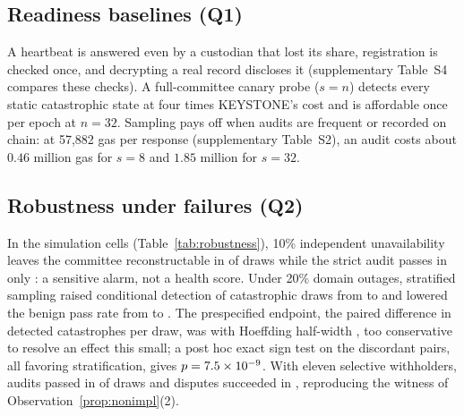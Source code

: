 \documentclass[Crown,sagev]{sagej}
\theoremstyle{plain}
\theoremstyle{definition}
\theoremstyle{remark}
\begin{document}
\begin{table}[t]
\caption{Experimental configuration. The baseline committee is $n=32$, $t=22$, $s=q=8$ with four failure domains of eight custodians.}
\label{tab:config}
\centering
\footnotesize

\end{table}

\subsection{Readiness baselines (Q1)}

A heartbeat is answered even by a custodian that lost its share, registration is checked once, and decrypting a real record discloses it (supplementary Table~S4 compares these checks). A full-committee canary probe ($s=n$) detects every static catastrophic state at four times KEYSTONE's cost and is affordable once per epoch at $n=32$. Sampling pays off when audits are frequent or recorded on chain: at 57{,}882 gas per response (supplementary Table~S2), an audit costs about $0.46$ million gas for $s=8$ and $1.85$ million for $s=32$.

\subsection{Robustness under failures (Q2)}\label{sec:eval-robust}

In the simulation cells (Table~\ref{tab:robustness}), 10\% independent unavailability leaves the committee reconstructable in \RIIDRecon{} of draws while the strict audit passes in only \RIIDAudit{}: a sensitive alarm, not a health score. Under 20\% domain outages, stratified sampling raised conditional detection of catastrophic draws from \RStratDetU{} to \RStratDetS{} and lowered the benign pass rate from \RStratPassU{} to \RStratPassS{}. The prespecified endpoint, the paired difference in detected catastrophes per draw, was \RStratD{} with Hoeffding half-width \RStratHW{}, too conservative to resolve an effect this small; a post hoc exact sign test on the \RStratDiscordant{} discordant pairs, all favoring stratification, gives $p=7.5\times10^{-9}$. With eleven selective withholders, audits passed in \RSWAudit{} of draws and disputes succeeded in \RSWDispute{}, reproducing the witness of Observation~\ref{prop:nonimpl}(2).

\begin{table}[t]
\caption{Simulation cells, 131{,}072 draws each, 95\% Wilson intervals. Reconstructable means at least $t$ custodians can serve the dispute.}
\label{tab:robustness}
\centering
\footnotesize

\end{table}
\end{document}
